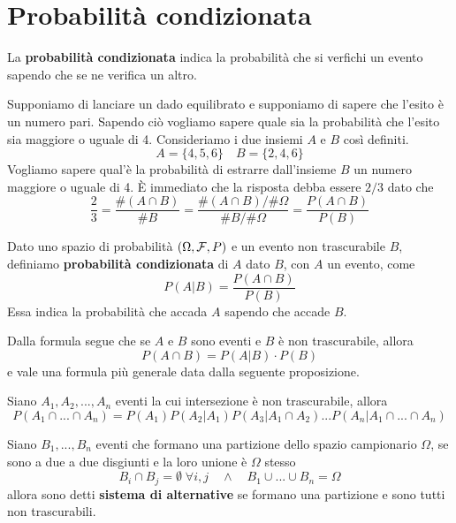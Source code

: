 \section{Probabilità condizionata}
La \textbf{probabilità condizionata} indica la probabilità che si verfichi un evento sapendo che
se ne verifica un altro.

\begin{example}
	Supponiamo di lanciare un dado equilibrato e supponiamo di sapere che l'esito è un numero
	pari. Sapendo ciò vogliamo sapere quale sia la probabilità che l'esito sia maggiore o uguale
	di 4. Consideriamo i due insiemi $A$ e $B$ così definiti.
	\[ A = \{ 4, 5, 6 \} \quad B = \{ 2, 4, 6 \} \]
	Vogliamo sapere qual'è la probabilità di estrarre dall'insieme $B$ un numero maggiore o uguale
	di 4. \`E immediato che la risposta debba essere $2/3$ dato che
	\[
		\frac{2}{3} = \frac{\# (A \cap B)}{\# B} =
		\frac{\# (A \cap B) / \# \Omega}{\# B / \# \Omega} =
		\frac{P(A \cap B)}{P(B)}
	\]
\end{example}

\begin{definition}
	Dato uno spazio di probabilità $(\Omega, \mathcal{F}, P)$ e un evento non trascurabile $B$, definiamo
	\textbf{probabilità condizionata} di $A$ dato $B$, con $A$ un evento, come
	\[ P(A | B) = \frac{P(A \cap B)}{P(B)} \]
	Essa indica la probabilità che accada $A$ sapendo che accade $B$.
\end{definition}

Dalla formula segue che se $A$ e $B$ sono eventi e $B$ è non trascurabile, allora
\[ P(A \cap B) = P(A | B) \cdot P(B) \]
e vale una formula più generale data dalla seguente proposizione.

\begin{proposition}
	Siano $A_1, A_2, ..., A_n$ eventi la cui intersezione è non trascurabile, allora
	\[
		P(A_1 \cap  ... \cap A_n) = P(A_1) P(A_2 | A_1) P(A_3 | A_1 \cap A_2)
		... P(A_n | A_1 \cap ... \cap A_n)
	\]
\end{proposition}

\begin{definition}
	Siano $B_1, ..., B_n$ eventi che formano una partizione dello spazio campionario $\Omega$, se
	sono a due a due disgiunti e la loro unione è $\Omega$ stesso
	\[ B_i \cap B_j = \emptyset \; \forall i,j \quad \land \quad B_1 \cup ... \cup B_n = \Omega \]
	allora sono detti \textbf{sistema di alternative} se formano una partizione e sono tutti non
	trascurabili.
\end{definition}

